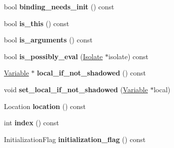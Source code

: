 \begin{DoxyCompactItemize}
\item 
\hypertarget{classv8_1_1internal_1_1_variable_a543e9f7a721e08b3c9203deebdbb37bf}{}bool {\bfseries binding\+\_\+needs\+\_\+init} () const \label{classv8_1_1internal_1_1_variable_a543e9f7a721e08b3c9203deebdbb37bf}

\item 
\hypertarget{classv8_1_1internal_1_1_variable_a904107d163319fcb3a8a0f8fa908dec0}{}bool {\bfseries is\+\_\+this} () const \label{classv8_1_1internal_1_1_variable_a904107d163319fcb3a8a0f8fa908dec0}

\item 
\hypertarget{classv8_1_1internal_1_1_variable_a635ceba227946a397a1aee3dd9a0aa9d}{}bool {\bfseries is\+\_\+arguments} () const \label{classv8_1_1internal_1_1_variable_a635ceba227946a397a1aee3dd9a0aa9d}

\item 
\hypertarget{classv8_1_1internal_1_1_variable_af9cfdfae484e98607d0c842c5df84289}{}bool {\bfseries is\+\_\+possibly\+\_\+eval} (\hyperlink{classv8_1_1internal_1_1_isolate}{Isolate} $\ast$isolate) const \label{classv8_1_1internal_1_1_variable_af9cfdfae484e98607d0c842c5df84289}

\item 
\hypertarget{classv8_1_1internal_1_1_variable_a73d7e6ef853b993c76de410ad38bd302}{}\hyperlink{classv8_1_1internal_1_1_variable}{Variable} $\ast$ {\bfseries local\+\_\+if\+\_\+not\+\_\+shadowed} () const \label{classv8_1_1internal_1_1_variable_a73d7e6ef853b993c76de410ad38bd302}

\item 
\hypertarget{classv8_1_1internal_1_1_variable_a89aa95ef6d4226e3ca0c9a862e27e252}{}void {\bfseries set\+\_\+local\+\_\+if\+\_\+not\+\_\+shadowed} (\hyperlink{classv8_1_1internal_1_1_variable}{Variable} $\ast$local)\label{classv8_1_1internal_1_1_variable_a89aa95ef6d4226e3ca0c9a862e27e252}

\item 
\hypertarget{classv8_1_1internal_1_1_variable_a867295bbf539314cd1fddde413d49d79}{}Location {\bfseries location} () const \label{classv8_1_1internal_1_1_variable_a867295bbf539314cd1fddde413d49d79}

\item 
\hypertarget{classv8_1_1internal_1_1_variable_a690fec1d7aa85f398361cbadb6cc9b3f}{}int {\bfseries index} () const \label{classv8_1_1internal_1_1_variable_a690fec1d7aa85f398361cbadb6cc9b3f}

\item 
\hypertarget{classv8_1_1internal_1_1_variable_a9ac58f8c846bcc880e49d563114a5222}{}Initialization\+Flag {\bfseries initialization\+\_\+flag} () const \label{classv8_1_1internal_1_1_variable_a9ac58f8c846bcc880e49d563114a5222}


\end{DoxyCompactItemize}
